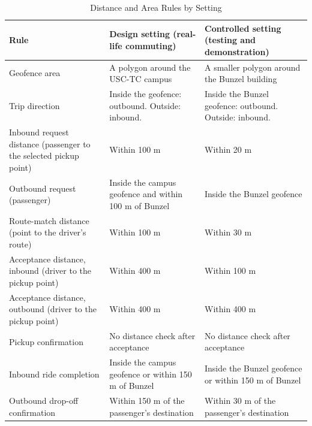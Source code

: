 \begin{table}[htbp]
    \centering
    \caption{Distance and Area Rules by Setting}
    \label{tab:rules-by-setting}
    \small
    \renewcommand{\arraystretch}{1.25}
    \begin{tabular}{|>{\raggedright\arraybackslash}p{}|>{\raggedright\arraybackslash}p{}|>{\raggedright\arraybackslash}p{}|}
        \hline
        \textbf{Rule} & \textbf{Design setting (real-life commuting)} & \textbf{Controlled setting (testing and demonstration)} \\
        \hline
        Geofence area & A polygon around the USC-TC campus & A smaller polygon around the Bunzel building \\
        \hline
        Trip direction & Inside the geofence: outbound. Outside: inbound. & Inside the Bunzel geofence: outbound. Outside: inbound. \\
        \hline
        Inbound request distance (passenger to the selected pickup point) & Within 100 m & Within 20 m \\
        \hline
        Outbound request (passenger) & Inside the campus geofence and within 100 m of Bunzel & Inside the Bunzel geofence \\
        \hline
        Route-match distance (point to the driver's route) & Within 100 m & Within 30 m \\
        \hline
        Acceptance distance, inbound (driver to the pickup point) & Within 400 m & Within 100 m \\
        \hline
        Acceptance distance, outbound (driver to the pickup point) & Within 400 m & Within 400 m \\
        \hline
        Pickup confirmation & No distance check after acceptance & No distance check after acceptance \\
        \hline
        Inbound ride completion & Inside the campus geofence or within 150 m of Bunzel & Inside the Bunzel geofence or within 150 m of Bunzel \\
        \hline
        Outbound drop-off confirmation & Within 150 m of the passenger's destination & Within 30 m of the passenger's destination \\
        \hline
    \end{tabular}
\end{table}

